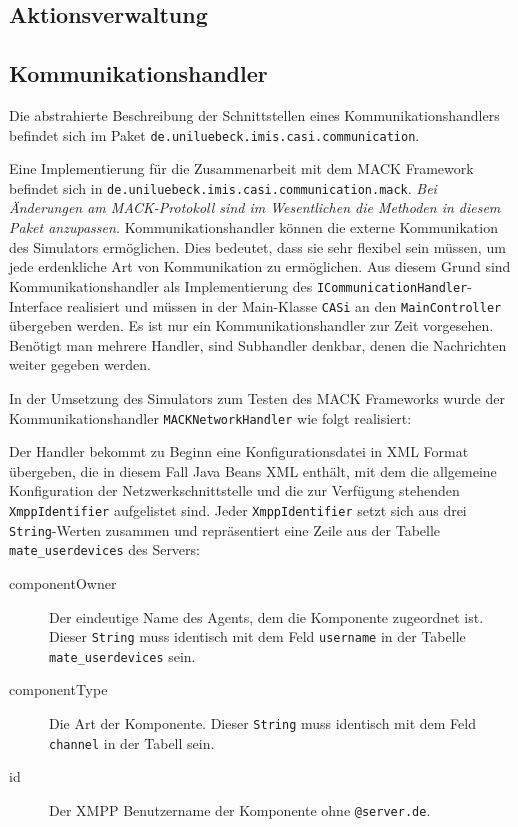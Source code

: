 \subsection{Aktionsverwaltung}\label{subsec:real_actionhandling}

\subsection{Kommunikationshandler}\label{subsec:real_communication}
Die abstrahierte Beschreibung der Schnittstellen eines Kommunikationshandlers befindet sich im Paket \texttt{de.uniluebeck.imis.casi.communication}. 

Eine Implementierung für die Zusammenarbeit mit dem MACK Framework befindet sich in \texttt{de.uni\-luebeck.imis.casi\-.com\-munication.mack}. \emph{Bei Änderungen am MACK-Protokoll sind im Wesentlichen die Methoden in diesem Paket anzupassen.}
Kommunikationshandler können die externe Kommunikation des Simulators ermöglichen. Dies bedeutet, dass sie sehr flexibel sein müssen, um jede erdenkliche Art von Kommunikation zu ermöglichen. Aus diesem Grund sind Kommunikationshandler als Implementierung des \texttt{ICommunication\-Handler}-Interface realisiert und müssen in der Main-Klasse \texttt{CASi} an den \texttt{MainController} übergeben werden. Es ist nur ein Kommunikationshandler zur Zeit vorgesehen. Benötigt man mehrere Handler, sind Subhandler denkbar, denen die Nachrichten weiter gegeben werden.

In der Umsetzung des Simulators zum Testen des MACK Frameworks wurde der Kommunikationshandler \texttt{MACKNetworkHandler} wie folgt realisiert:

Der Handler bekommt zu Beginn eine Konfigurationsdatei in XML Format übergeben, die in diesem Fall Java Beans XML enthält, mit dem die allgemeine Konfiguration der Netzwerkschnittstelle und die zur Verfügung stehenden \texttt{XmppIdentifier} aufgelistet sind. Jeder \texttt{XmppIdentifier} setzt sich aus drei \texttt{String}-Werten zusammen und repräsentiert eine Zeile aus der Tabelle \texttt{mate\_user\-devices} des Servers:\begin{description}
	\item[componentOwner] Der eindeutige Name des Agents, dem die Komponente zugeordnet ist. Dieser \texttt{String} muss identisch mit dem Feld \texttt{username} in der Tabelle \texttt{mate\_userdevices} sein.
	\item[componentType] Die Art der Komponente. Dieser \texttt{String} muss identisch mit dem Feld \texttt{channel} in der Tabell sein.
	\item[id] Der XMPP Benutzername der Komponente ohne \texttt{@server.de}. 
\end{description}

